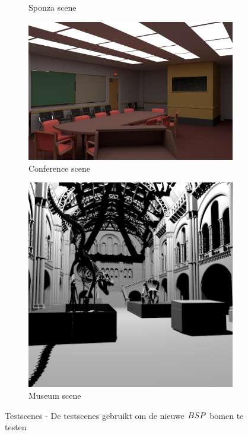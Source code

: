 \begin{figure}
\begin{subfigure}[t]{0.20\textwidth}
    \caption{Sponza scene}
    \label{fig:results-scene-sponza}    
  \end{subfigure}
  \begin{subfigure}[t]{0.29\textwidth}
    \centering
    \includegraphics[width=1\linewidth]{img/conferencehall}
    \caption{Conference scene}
    \label{fig:results-scene-conference}    
  \end{subfigure}
  \begin{subfigure}[t]{0.20\textwidth}
    \centering
    \includegraphics[width=1\linewidth]{img/museum}
    \caption{Museum scene}
    \label{fig:results-scene-museum}    
  \end{subfigure}
  \caption[Testscenes]{Testscenes - \small De testscenes gebruikt om de nieuwe $BSP$ bomen te testen}
  \label{fig:results-scenes}
\end{figure}

